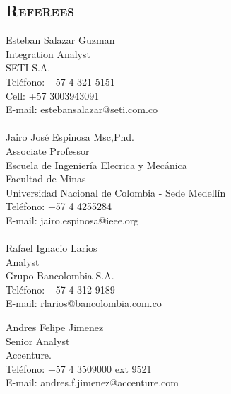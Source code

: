 \begin{resume}
\section{\textsc{Referees}}


 Esteban Salazar Guzman\\
 Integration Analyst \\
 SETI S.A. \\
 Tel\'{e}fono: +57 4 321-5151 \\
 Cell: +57 3003943091 \\ 
 E-mail: estebansalazar@seti.com.co\\
 \\  
 Jairo Jos\'{e} Espinosa Msc,Phd.\\
 Associate Professor \\
 Escuela de Ingenier\'{i}a Elecrica y Mec\'{a}nica \\
 Facultad de Minas \\
 Universidad Nacional de Colombia - Sede  Medell\'{i}n\\
 Tel\'{e}fono: +57 4 4255284 \\
 E-mail: jairo.espinosa@ieee.org\\
 \\  
 Rafael Ignacio Larios\\
 Analyst  \\
 Grupo Bancolombia S.A. \\
 Tel\'{e}fono: +57 4 312-9189  \\
 E-mail: rlarios@bancolombia.com.co 

 Andres Felipe Jimenez\\
 Senior Analyst  \\
 Accenture. \\
 Tel\'{e}fono: +57 4 3509000 ext 9521  \\
 E-mail: andres.f.jimenez@accenture.com \\



\end{resume}
